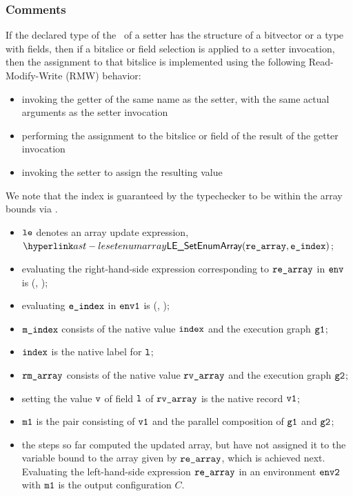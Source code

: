 \subsubsection{Comments}
If the declared type of the \rhsexpression\ of a setter has the structure of a
bitvector or a type with fields, then if a bitslice or field selection is
applied to a setter invocation, then the assignment to that bitslice is
implemented using the following Read-Modify-Write (RMW) behavior:
\begin{itemize}
\item invoking the getter of the same name as the setter, with the same actual
arguments as the setter invocation
\item performing the assignment to the bitslice or field of the result of the
getter invocation
\item invoking the setter to assign the resulting value
\end{itemize}

We note that the index is guaranteed by the typechecker to be within the array bounds
via .

\ProseParagraph
\AllApply
\begin{itemize}
  \item $\texttt{le}$ denotes an array update expression, $\LESetEnumArray(\rearray, \eindex)$;
  \item evaluating the right-hand-side expression corresponding to $\texttt{re\_array}$ in $\texttt{env}$
  is \Normal(\rmarray, \envone)\ProseOrAbnormal;
  \item evaluating $\texttt{e\_index}$ in $\texttt{env1}$ is \Normal(\mindex, \envtwo)\ProseOrAbnormal;
  \item $\texttt{m\_index}$ consists of the native value $\texttt{index}$ and the execution graph $\texttt{g1}$;
  \item $\texttt{index}$ is the native label for $\texttt{l}$;
  \item $\texttt{rm\_array}$ consists of the native value $\texttt{rv\_array}$ and the execution graph $\texttt{g2}$;
  \item setting the value $\texttt{v}$ of field $\texttt{l}$ of $\texttt{rv\_array}$ is the native record $\texttt{v1}$;
  \item $\texttt{m1}$ is the pair consisting of $\texttt{v1}$ and the parallel composition of $\texttt{g1}$ and $\texttt{g2}$;
  \item the steps so far computed the updated array, but have not assigned it to the variable
  bound to the array given by $\texttt{re\_array}$, which is achieved next.
  Evaluating the left-hand-side expression $\texttt{re\_array}$ in an environment $\texttt{env2}$ with $\texttt{m1}$
  is the output configuration $C$.
\end{itemize}

